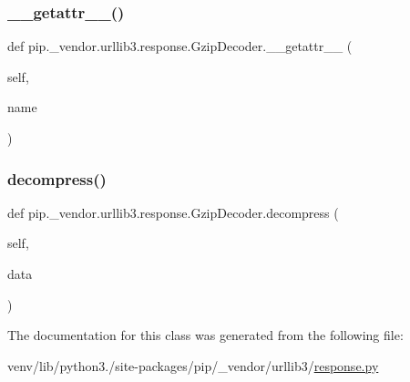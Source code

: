 \subsubsection{\texorpdfstring{\+\_\+\+\_\+getattr\+\_\+\+\_\+()}{\_\_getattr\_\_()}}
{\footnotesize\ttfamily def pip.\+\_\+vendor.\+urllib3.\+response.\+Gzip\+Decoder.\+\_\+\+\_\+getattr\+\_\+\+\_\+ (\begin{DoxyParamCaption}\item[{}]{self,  }\item[{}]{name }\end{DoxyParamCaption})}

\mbox{\label{classpip_1_1__vendor_1_1urllib3_1_1response_1_1GzipDecoder_a12841e852b947e75a14a6272439ceb32}} 
\subsubsection{\texorpdfstring{decompress()}{decompress()}}
{\footnotesize\ttfamily def pip.\+\_\+vendor.\+urllib3.\+response.\+Gzip\+Decoder.\+decompress (\begin{DoxyParamCaption}\item[{}]{self,  }\item[{}]{data }\end{DoxyParamCaption})}



The documentation for this class was generated from the following file\+:\begin{DoxyCompactItemize}
\item 
venv/lib/python3./site-\/packages/pip/\+\_\+vendor/urllib3/\hyperlink{response_8py}{response.\+py}\end{DoxyCompactItemize}
